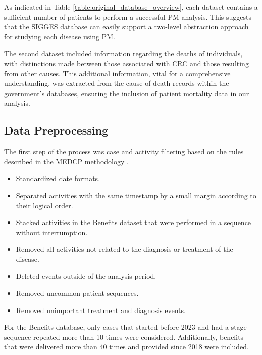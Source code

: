 As indicated in Table \ref{table:original_database_overview}, each dataset contains a sufficient number of patients to perform a successful PM analysis. This suggests that the SIGGES database can easily support a two-level abstraction approach for studying each disease using PM.

The second dataset included information regarding the deaths of individuals, with distinctions made between those associated with CRC and those resulting from other causes. This additional information, vital for a comprehensive understanding, was extracted from the cause of death records within the government's databases, ensuring the inclusion of patient mortality data in our analysis.

\label{sec:data_preprocessing}
\subsection*{Data Preprocessing}

The first step of the process was case and activity filtering based on the rules described in the MEDCP methodology \cite{vathy-fogarassy_multi-level_2022}. 

\begin{itemize}

    \item {Standardized date formats.}

    \item {Separated activities with the same timestamp by a small margin according to their logical order.}

    \item {Stacked activities in the Benefits dataset that were performed in a sequence without interrumption.}

    \item {Removed all activities not related to the diagnosis or treatment of the disease.}

    \item {Deleted events outside of the analysis period.}

    \item {Removed uncommon patient sequences.}

    \item {Removed unimportant treatment and diagnosis events.}
\end{itemize}
 

For the Benefits database, only cases that started before 2023 and had a stage sequence repeated more than 10 times were considered. Additionally, benefits that were delivered more than 40 times and provided since 2018 were included.

